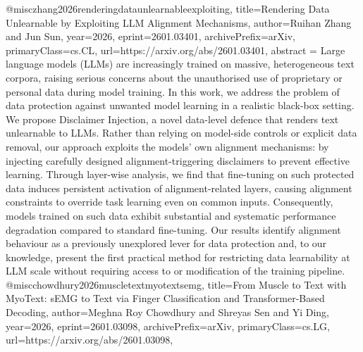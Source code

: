 {}@misc{zhang2026renderingdataunlearnableexploiting,
      title={Rendering Data Unlearnable by Exploiting LLM Alignment Mechanisms}, 
      author={Ruihan Zhang and Jun Sun},
      year={2026},
      eprint={2601.03401},
      archivePrefix={arXiv},
      primaryClass={cs.CL},
      url={https://arxiv.org/abs/2601.03401},
      abstract = {Large language models (LLMs) are increasingly trained on massive, heterogeneous text corpora, raising serious concerns about the unauthorised use of proprietary or personal data during model training. In this work, we address the problem of data protection against unwanted model learning in a realistic black-box setting. We propose Disclaimer Injection, a novel data-level defence that renders text unlearnable to LLMs. Rather than relying on model-side controls or explicit data removal, our approach exploits the models' own alignment mechanisms: by injecting carefully designed alignment-triggering disclaimers to prevent effective learning. Through layer-wise analysis, we find that fine-tuning on such protected data induces persistent activation of alignment-related layers, causing alignment constraints to override task learning even on common inputs. Consequently, models trained on such data exhibit substantial and systematic performance degradation compared to standard fine-tuning. Our results identify alignment behaviour as a previously unexplored lever for data protection and, to our knowledge, present the first practical method for restricting data learnability at LLM scale without requiring access to or modification of the training pipeline.}
}@misc{chowdhury2026muscletextmyotextsemg,
      title={From Muscle to Text with MyoText: sEMG to Text via Finger Classification and Transformer-Based Decoding}, 
      author={Meghna Roy Chowdhury and Shreyas Sen and Yi Ding},
      year={2026},
      eprint={2601.03098},
      archivePrefix={arXiv},
      primaryClass={cs.LG},
      url={https://arxiv.org/abs/2601.03098},
}
